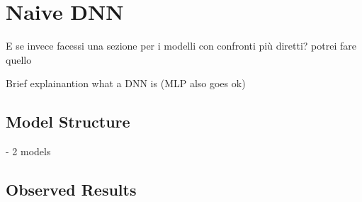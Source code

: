 \section{Naive DNN}
\commentline E se invece facessi una sezione per i modelli con confronti più diretti?
potrei fare quello

Brief explainantion what a DNN is (MLP also goes ok)

\subsection{Model Structure}

- 2 models

\subsection{Observed Results}

